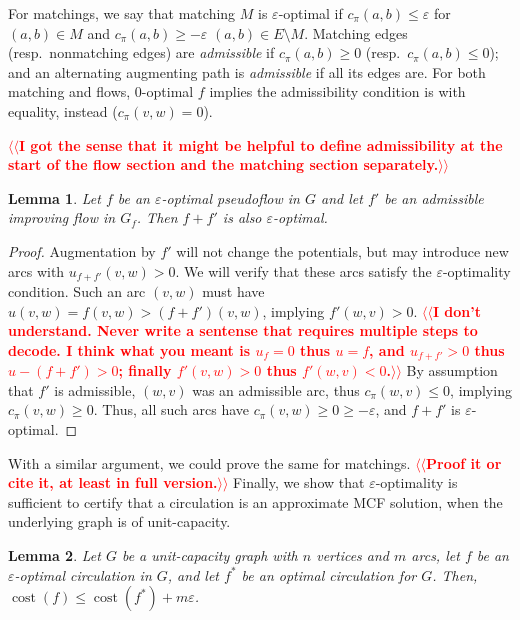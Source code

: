 \documentclass[11pt]{article}
\makeatletter
\def\eps{\varepsilon}
\theoremstyle{plain}
\newtheorem{lemma}{Lemma}[section]
\numberwithin{figure}{section}
\def\cost{\operatorname{cost}}
\def\n@te#1{\textsf{\boldmath \textbf{$\langle\!\langle$#1$\rangle\!\rangle$}}\leavevmode}
\def\note#1{\textcolor{red}{\n@te{#1}}}
\makeatother
\begin{document}
For matchings, we say that matching $M$ is $\eps$-optimal if $c_\pi(a, b) \leq \eps$ for
$(a, b) \in M$ and $c_\pi(a, b) \geq -\eps$ $(a, b) \in E \setminus M$.
Matching edges (resp.\ nonmatching edges) are \emph{admissible} if $c_\pi(a, b) \geq 0$ (resp.\ $c_\pi(a, b) \leq 0$); and an alternating augmenting path is \emph{admissible}
if all its edges are.
For both matching and flows, 0-optimal $f$ implies the admissibility condition
is with equality, instead ($c_\pi(v, w) = 0$).

\note{I got the sense that it might be helpful to define admissibility at the start of the flow section and the matching section separately.}

\begin{lemma}
	Let $f$ be an $\eps$-optimal pseudoflow in $G$ and let $f'$ be an
	admissible improving flow in $G_f$.
	Then $f + f'$ is also $\eps$-optimal.
\end{lemma}
\begin{proof}
	Augmentation by $f'$ will not change the potentials, but may introduce
	new arcs with $u_{f+f'}(v, w) > 0$.
	We will verify that these arcs satisfy the $\eps$-optimality condition.
	Such an arc $(v, w)$ must have $u(v, w) = f(v, w) > (f+f')(v, w)$,
	implying $f'(w, v) > 0$.
\note{I don't understand.  Never write a sentense that requires multiple steps to decode. I think what you meant is $u_f = 0$ thus $u=f$, and $u_{f+f'} > 0$ thus $u-(f+f') > 0$; finally $f'(v,w) > 0$ thus $f'(w,v) < 0$.}
	By assumption that $f'$ is admissible, $(w, v)$ was an admissible arc, thus
	$c_\pi(w, v) \leq 0$, implying $c_\pi(v, w) \geq 0$.
	Thus, all such arcs have $c_\pi(v, w) \geq 0 \geq -\eps$, and $f + f'$
	is $\eps$-optimal.
\end{proof}

With a similar argument, we could prove the same for matchings. \note{Proof it or cite it, at least in full version.}
Finally, we show that $\eps$-optimality is sufficient to certify that a
circulation is an approximate MCF solution, when the underlying graph is
of unit-capacity.

\begin{lemma}
\label{lemma:mcf_cost}
Let $G$ be a unit-capacity graph with $n$ vertices and $m$ arcs, let $f$ be an
$\eps$-optimal circulation in $G$, and let $f^*$ be an optimal circulation for
$G$.
Then, $\cost(f) \leq \cost(f^*) + m\eps$.
\end{lemma}
\end{document}
